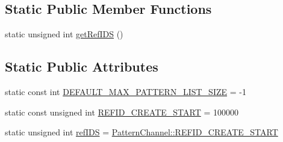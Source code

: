 \subsection*{\-Static \-Public \-Member \-Functions}
\begin{DoxyCompactItemize}
\item 
static unsigned int \hyperlink{classcryomesh_1_1state_1_1PatternChannel_a4a1ca89d0b7867c4faa13d779a35ae97}{get\-Ref\-I\-D\-S} ()
\end{DoxyCompactItemize}
\subsection*{\-Static \-Public \-Attributes}
\begin{DoxyCompactItemize}
\item 
static const int \hyperlink{classcryomesh_1_1state_1_1PatternChannel_a2931ca38ca2e5d816c8917cb857e62fc}{\-D\-E\-F\-A\-U\-L\-T\-\_\-\-M\-A\-X\-\_\-\-P\-A\-T\-T\-E\-R\-N\-\_\-\-L\-I\-S\-T\-\_\-\-S\-I\-Z\-E} = -\/1
\item 
static const unsigned int \hyperlink{classcryomesh_1_1state_1_1PatternChannel_a1476695074d7d8e184aed0c4401f72d5}{\-R\-E\-F\-I\-D\-\_\-\-C\-R\-E\-A\-T\-E\-\_\-\-S\-T\-A\-R\-T} = 100000
\item 
static unsigned int \hyperlink{classcryomesh_1_1state_1_1PatternChannel_aafed47c54c1db97487a333f43bb85e25}{ref\-I\-D\-S} = \hyperlink{classcryomesh_1_1state_1_1PatternChannel_a1476695074d7d8e184aed0c4401f72d5}{\-Pattern\-Channel\-::\-R\-E\-F\-I\-D\-\_\-\-C\-R\-E\-A\-T\-E\-\_\-\-S\-T\-A\-R\-T}
\end{DoxyCompactItemize}
